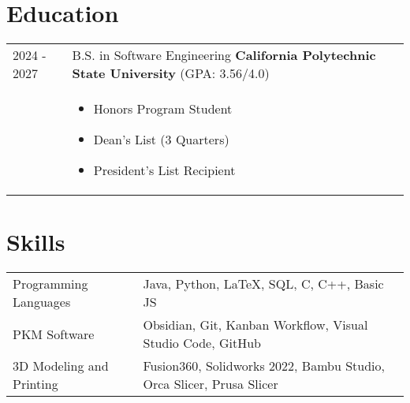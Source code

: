 \documentclass[a4paper,12pt]{article}
\begin{document}
\section{Education}
\begin{tabularx}{\linewidth}{@{}l X@{}}	
2024 - 2027 & B.S. in Software Engineering \textbf{California Polytechnic State University} \hfill (GPA: 3.56/4.0) \\
& \begin{itemize}[leftmargin=*, nosep]
    \item Honors Program Student 
    \item Dean's List (3 Quarters) 
    \item President's List Recipient
  \end{itemize}
\end{tabularx}

\section{Skills}
\begin{tabularx}{\linewidth}{@{}l X@{}}
Programming Languages &  \normalsize{Java, Python, LaTeX, SQL, C, C++, Basic JS}\\
PKM Software  &  \normalsize{Obsidian, Git, Kanban Workflow, Visual Studio Code, GitHub}\\  
3D Modeling and Printing  &  \normalsize{Fusion360, Solidworks 2022, Bambu Studio, Orca Slicer, Prusa Slicer}\\
\end{tabularx}

\vfill
{}
\end{document}
